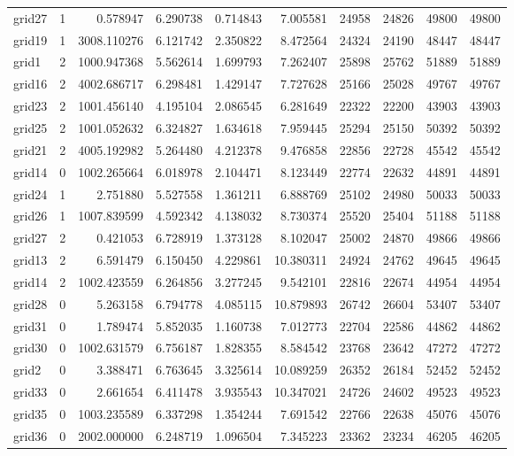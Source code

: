 \begin{longtable}{|l|r|r|r|r|r|r|r|r|r|}
grid27 & 1 & 0.578947 & 6.290738 & 0.714843 & 7.005581 & 24958 & 24826 & 49800 & 49800 \\
grid19 & 1 & 3008.110276 & 6.121742 & 2.350822 & 8.472564 & 24324 & 24190 & 48447 & 48447 \\
grid1 & 2 & 1000.947368 & 5.562614 & 1.699793 & 7.262407 & 25898 & 25762 & 51889 & 51889 \\
grid16 & 2 & 4002.686717 & 6.298481 & 1.429147 & 7.727628 & 25166 & 25028 & 49767 & 49767 \\
grid23 & 2 & 1001.456140 & 4.195104 & 2.086545 & 6.281649 & 22322 & 22200 & 43903 & 43903 \\
grid25 & 2 & 1001.052632 & 6.324827 & 1.634618 & 7.959445 & 25294 & 25150 & 50392 & 50392 \\
grid21 & 2 & 4005.192982 & 5.264480 & 4.212378 & 9.476858 & 22856 & 22728 & 45542 & 45542 \\
grid14 & 0 & 1002.265664 & 6.018978 & 2.104471 & 8.123449 & 22774 & 22632 & 44891 & 44891 \\
grid24 & 1 & 2.751880 & 5.527558 & 1.361211 & 6.888769 & 25102 & 24980 & 50033 & 50033 \\
grid26 & 1 & 1007.839599 & 4.592342 & 4.138032 & 8.730374 & 25520 & 25404 & 51188 & 51188 \\
grid27 & 2 & 0.421053 & 6.728919 & 1.373128 & 8.102047 & 25002 & 24870 & 49866 & 49866 \\
grid13 & 2 & 6.591479 & 6.150450 & 4.229861 & 10.380311 & 24924 & 24762 & 49645 & 49645 \\
grid14 & 2 & 1002.423559 & 6.264856 & 3.277245 & 9.542101 & 22816 & 22674 & 44954 & 44954 \\
grid28 & 0 & 5.263158 & 6.794778 & 4.085115 & 10.879893 & 26742 & 26604 & 53407 & 53407 \\
grid31 & 0 & 1.789474 & 5.852035 & 1.160738 & 7.012773 & 22704 & 22586 & 44862 & 44862 \\
grid30 & 0 & 1002.631579 & 6.756187 & 1.828355 & 8.584542 & 23768 & 23642 & 47272 & 47272 \\
grid2 & 0 & 3.388471 & 6.763645 & 3.325614 & 10.089259 & 26352 & 26184 & 52452 & 52452 \\
grid33 & 0 & 2.661654 & 6.411478 & 3.935543 & 10.347021 & 24726 & 24602 & 49523 & 49523 \\
grid35 & 0 & 1003.235589 & 6.337298 & 1.354244 & 7.691542 & 22766 & 22638 & 45076 & 45076 \\
grid36 & 0 & 2002.000000 & 6.248719 & 1.096504 & 7.345223 & 23362 & 23234 & 46205 & 46205 \\

\end{longtable}
